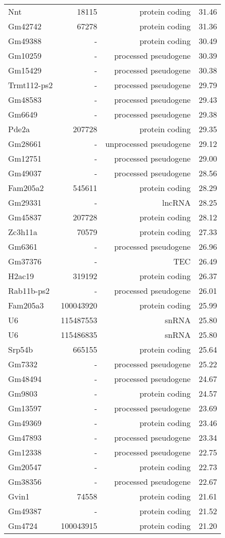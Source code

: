 \begin{longtable}[t]{lrrr}
Nnt & 18115 & protein coding & 31.46\\
\addlinespace
Gm42742 & 67278 & protein coding & 31.36\\
Gm49388 & - & protein coding & 30.49\\
Gm10259 & - & processed pseudogene & 30.39\\
Gm15429 & - & processed pseudogene & 30.38\\
Trmt112-ps2 & - & processed pseudogene & 29.79\\
\addlinespace
Gm48583 & - & processed pseudogene & 29.43\\
Gm6649 & - & processed pseudogene & 29.38\\
Pde2a & 207728 & protein coding & 29.35\\
Gm28661 & - & unprocessed pseudogene & 29.12\\
Gm12751 & - & processed pseudogene & 29.00\\
\addlinespace
Gm49037 & - & processed pseudogene & 28.56\\
Fam205a2 & 545611 & protein coding & 28.29\\
Gm29331 & - & lncRNA & 28.25\\
Gm45837 & 207728 & protein coding & 28.12\\
Zc3h11a & 70579 & protein coding & 27.33\\
\addlinespace
Gm6361 & - & processed pseudogene & 26.96\\
Gm37376 & - & TEC & 26.49\\
H2ac19 & 319192 & protein coding & 26.37\\
Rab11b-ps2 & - & processed pseudogene & 26.01\\
Fam205a3 & 100043920 & protein coding & 25.99\\
\addlinespace
U6 & 115487553 & snRNA & 25.80\\
U6 & 115486835 & snRNA & 25.80\\
Srp54b & 665155 & protein coding & 25.64\\
Gm7332 & - & processed pseudogene & 25.22\\
Gm48494 & - & processed pseudogene & 24.67\\
\addlinespace
Gm9803 & - & protein coding & 24.57\\
Gm13597 & - & processed pseudogene & 23.69\\
Gm49369 & - & protein coding & 23.46\\
Gm47893 & - & processed pseudogene & 23.34\\
Gm12338 & - & processed pseudogene & 22.75\\
\addlinespace
Gm20547 & - & protein coding & 22.73\\
Gm38356 & - & processed pseudogene & 22.67\\
Gvin1 & 74558 & protein coding & 21.61\\
Gm49387 & - & protein coding & 21.52\\
Gm4724 & 100043915 & protein coding & 21.20\\*
\end{longtable}
\endgroup{}
